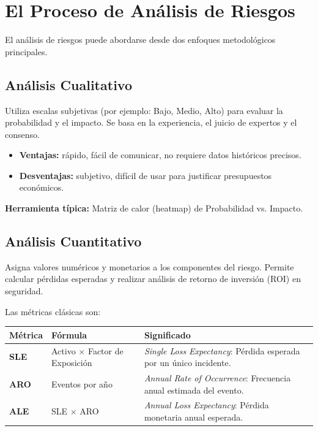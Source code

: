 \documentclass[11pt,a4paper]{article}
\begin{document}
\section{El Proceso de Análisis de Riesgos}
El análisis de riesgos puede abordarse desde dos enfoques metodológicos principales.

\subsection{Análisis Cualitativo}
Utiliza escalas subjetivas (por ejemplo: Bajo, Medio, Alto) para evaluar la probabilidad y el impacto. Se basa en la experiencia, el juicio de expertos y el consenso.

\begin{itemize}[leftmargin=*]
  \item \textbf{Ventajas:} rápido, fácil de comunicar, no requiere datos históricos precisos.
  \item \textbf{Desventajas:} subjetivo, difícil de usar para justificar presupuestos económicos.
\end{itemize}

\textbf{Herramienta típica:} Matriz de calor (heatmap) de Probabilidad vs. Impacto.

\subsection{Análisis Cuantitativo}
Asigna valores numéricos y monetarios a los componentes del riesgo. Permite calcular pérdidas esperadas y realizar análisis de retorno de inversión (ROI) en seguridad.

Las métricas clásicas son:

\begin{center}
\renewcommand{\arraystretch}{1.35}
\begin{tabularx}{\textwidth}{@{} p{2.2cm} p{2.8cm} X @{}}
\toprule
\textbf{Métrica} & \textbf{Fórmula} & \textbf{Significado} \\
\midrule
\textbf{SLE} & Activo $\times$ Factor de Exposición & \textit{Single Loss Expectancy}: Pérdida esperada por un único incidente. \\
\textbf{ARO} & Eventos por año & \textit{Annual Rate of Occurrence}: Frecuencia anual estimada del evento. \\
\textbf{ALE} & SLE $\times$ ARO & \textit{Annual Loss Expectancy}: Pérdida monetaria anual esperada. \\
\bottomrule
\end{tabularx}
\end{center}
\end{document}
